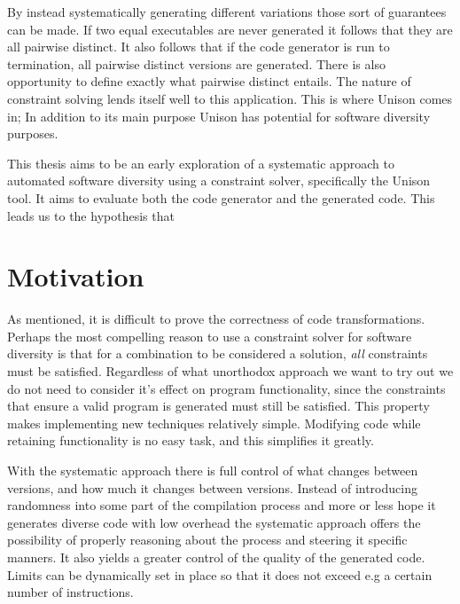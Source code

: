 By instead systematically generating different variations those sort of guarantees can be
made. If two equal executables are never generated it follows that they are all pairwise
distinct. It also follows that if the code generator is run to termination, all pairwise
distinct versions are generated. There is also opportunity to define exactly what pairwise
distinct entails. The nature of constraint solving lends itself well to this application.
This is where Unison comes in; In addition to its main purpose Unison has potential for
software diversity purposes.

This thesis aims to be an early exploration of a systematic approach to automated software
diversity using a constraint solver, specifically the Unison tool. It aims to evaluate
both the code generator and the generated code. This leads us to the hypothesis that


\section{Motivation}

As mentioned, it is difficult to prove the correctness of code transformations. Perhaps
the most compelling reason to use a constraint solver for software diversity is that for
a combination to be considered a solution, \textit{all} constraints must be satisfied.
Regardless of what unorthodox approach we want to try out we do not need to consider it's
effect on program functionality, since the constraints that ensure a valid program is
generated must still be satisfied. This property makes implementing new techniques
relatively simple. Modifying code while retaining functionality is no easy task, and this
simplifies it greatly.

With the systematic approach there is full control of what changes between versions, and
how much it changes between versions. Instead of introducing randomness into some part of
the compilation process and more or less hope it generates diverse code with low overhead
the systematic approach offers the possibility of properly reasoning about the process and
steering it specific manners. It also yields a greater control of the quality of the
generated code. Limits can be dynamically set in place so that it does not exceed e.g a
certain number of instructions.
